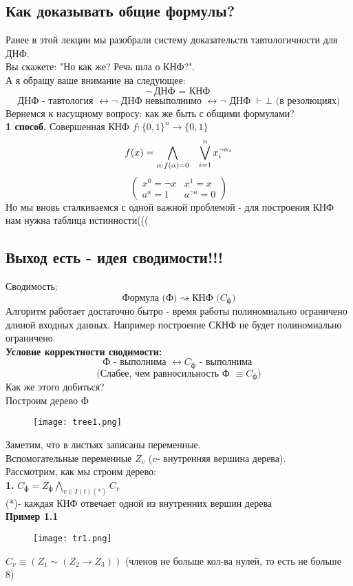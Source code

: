 \subsection{Как доказывать общие формулы?}
Ранее в этой лекции мы разобрали систему доказательств тавтологичности для ДНФ.\\ Вы скажете: "Но как же? Речь шла о КНФ?".\\
А я обращу ваше внимание на следующее:
\[
\neg \textbf{ДНФ $=$ КНФ}\]
\[
\textbf{ДНФ - тавтология $\leftrightarrow \neg $ ДНФ невыполнимо $\leftrightarrow \neg$ ДНФ $\vdash \bot$ (в резолюциях)}
\]
Вернемся к насущному вопросу: как же быть с общими формулами?\\
\textbf{1 способ.} Совершенная КНФ $f: \{0,1\}^n \to \{0,1\}$\\
\[
f(x) = \underset{\alpha: f(\alpha)=0}{\bigwedge} \hspace{3mm} \bigvee\limits_{i=1}^n x_i^{\neg \alpha_i}
\]
\[
\begin{pmatrix}
  x^0= \neg x& x^{1}=x\\
  a^a=1& a^{\neg a}=0
\end{pmatrix}
\]
Но мы вновь сталкиваемся с одной важной проблемой - для построения КНФ нам нужна таблица истинности(((
\subsection{Выход есть - идея сводимости!!!}
Сводимость:
\[
\textbf{Формула (Ф)} \rightsquigarrow \textbf{КНФ ($C_{\text{ф}}$)}
\]
Алгоритм работает достаточно бытро - время работы полиномиально ограничено длиной входных данных. Например построение СКНФ не будет полиномиально ограничено.\\
\textbf{Условие корректности сводимости:}\\
\[
\textbf{Ф - выполнима $\leftrightarrow C_{\text{ф}}$ - выполнима }
\]
\[
\text{(Слабее, чем равносильность Ф $\equiv C_{\text{ф}} $)}
\]
Как же этого добиться?\\
Построим дерево Ф\\
\begin{figure}[!h]
	\texttt{[image: tree1.png]}
\end{figure}
Заметим, что в листьях записаны переменные.\\
Вспомогательные переменные $Z_v$ ($v$- внутренняя вершина дерева).\\
Рассмотрим, как мы строим дерево:\\
\textbf{1.} $C_{\text{ф}} = Z_{\text{ф}} \underset{v \in I(t) (*)}{\bigwedge} C_v$\\
    (*)- каждая КНФ отвечает одной из внутренних вершин дерева\\
\textbf{Пример 1.1}\\
\begin{figure}[!h]
	\texttt{[image: tr1.png]}
\end{figure}
$C_v \equiv (Z_1 \sim (Z_2 \to Z_3))$ (членов не больше кол-ва нулей, то есть не больше 8)\\

